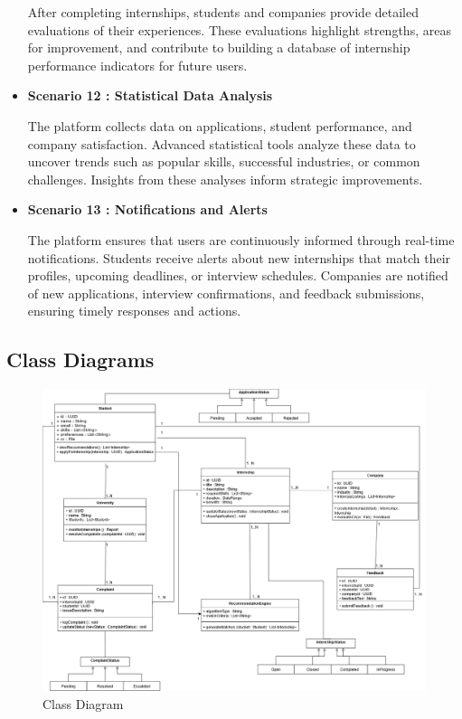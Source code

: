 \begin{itemize}
After completing internships, students and companies provide detailed evaluations of their experiences. These evaluations highlight strengths, areas for improvement, and contribute to building a database of internship performance indicators for future users.
\item \textbf{Scenario 12 : Statistical Data Analysis} 

The platform collects data on applications, student performance, and company satisfaction. Advanced statistical tools analyze these data to uncover trends such as popular skills, successful industries, or common challenges. Insights from these analyses inform strategic improvements.
\item \textbf{Scenario 13 : Notifications and Alerts} 

The platform ensures that users are continuously informed through real-time notifications. Students receive alerts about new internships that match their profiles, upcoming deadlines, or interview schedules. Companies are notified of new applications, interview confirmations, and feedback submissions, ensuring timely responses and actions.
\end{itemize}
\subsection{Class Diagrams}
\label{subsec:class_diagrams}%
\begin{figure}[H]
    \centering
    \includegraphics[width=1\linewidth]{Images/Class diagrams/ClassDiagram.png}
    \caption{Class Diagram}
    \label{fig:enter-label}
    
    
\end{figure}

